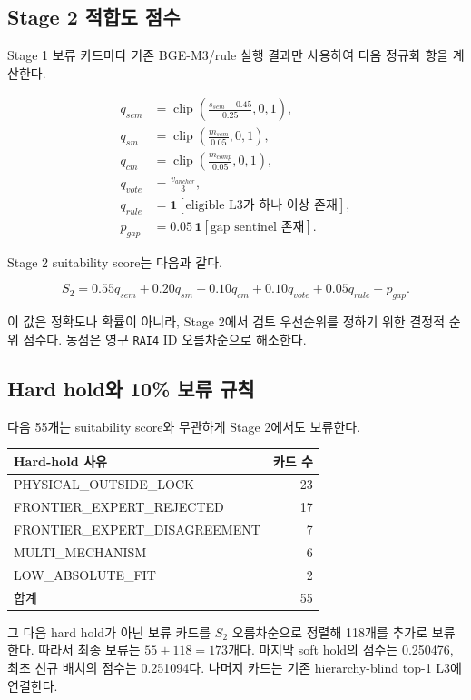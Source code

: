 \documentclass[11pt,a4paper]{article}
\newcommand{\code}[1]{\texttt{#1}}
\begin{document}
\subsection{Stage 2 적합도 점수}

Stage 1 보류 카드마다 기존 BGE-M3/rule 실행 결과만 사용하여 다음 정규화 항을 계산한다.

\begin{align*}
q_{sem} &= \operatorname{clip}\left(\frac{s_{sem}-0.45}{0.25},0,1\right),\\
q_{sm} &= \operatorname{clip}\left(\frac{m_{sem}}{0.05},0,1\right),\\
q_{cm} &= \operatorname{clip}\left(\frac{m_{comp}}{0.05},0,1\right),\\
q_{vote} &= \frac{v_{anchor}}{3},\\
q_{rule} &= \mathbf{1}[\text{eligible L3가 하나 이상 존재}],\\
p_{gap} &= 0.05\,\mathbf{1}[\text{gap sentinel 존재}].
\end{align*}

Stage 2 suitability score는 다음과 같다.

\[
S_2 = 0.55q_{sem}+0.20q_{sm}+0.10q_{cm}+0.10q_{vote}+0.05q_{rule}-p_{gap}.
\]

이 값은 정확도나 확률이 아니라, Stage 2에서 검토 우선순위를 정하기 위한
결정적 순위 점수다. 동점은 영구 \code{RAI4} ID 오름차순으로 해소한다.

\subsection{Hard hold와 10\% 보류 규칙}

다음 55개는 suitability score와 무관하게 Stage 2에서도 보류한다.

\begin{longtable}{lr}
\toprule
Hard-hold 사유 & 카드 수 \\
\midrule
\endhead
PHYSICAL\_OUTSIDE\_LOCK & 23 \\
FRONTIER\_EXPERT\_REJECTED & 17 \\
FRONTIER\_EXPERT\_DISAGREEMENT & 7 \\
MULTI\_MECHANISM & 6 \\
LOW\_ABSOLUTE\_FIT & 2 \\
\midrule
합계 & 55 \\
\bottomrule
\end{longtable}

그 다음 hard hold가 아닌 보류 카드를 $S_2$ 오름차순으로 정렬해 118개를 추가로
보류한다. 따라서 최종 보류는 $55+118=173$개다. 마지막 soft hold의 점수는
0.250476, 최초 신규 배치의 점수는 0.251094다. 나머지 카드는 기존 hierarchy-blind
top-1 L3에 연결한다.
\end{document}
